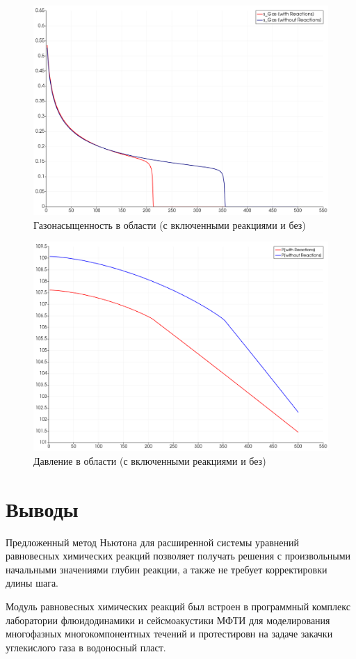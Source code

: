 \documentclass[14pt,a4paper]{extarticle}
\begin{document}
\begin{figure}[h!]
\centering
\includegraphics[width=.75\textwidth]{sG}
\caption{Газонасыщенность в области (с включенными реакциями и без)} \label{fig:pic2}
\end{figure}

\begin{figure}[h!]
\centering
\includegraphics[width=.75\textwidth]{P}
\caption{Давление в области (с включенными реакциями и без)} \label{fig:pic3}
\end{figure}

\clearpage
\section{Выводы}

Предложенный метод Ньютона для расширенной системы уравнений равновесных химических реакций позволяет получать решения с произвольными начальными значениями глубин реакции, а также не требует корректировки длины шага. 

Модуль равновесных химических реакций был встроен в программный комплекс лаборатории флюидодинамики и сейсмоакустики МФТИ для моделирования многофазных многокомпонентных течений и протестировн на задаче закачки углекислого газа в водоносный пласт.
\end{document}
